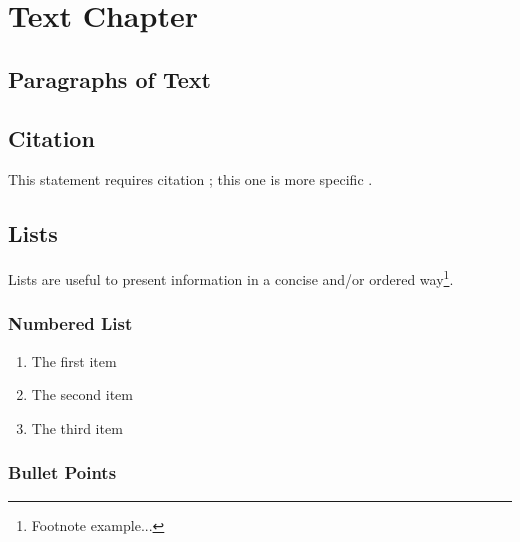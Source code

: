 \documentclass[11pt,fleqn]{book} %
\begin{document}
\pagestyle{fancy} %



\chapter{Text Chapter}

\section{Paragraphs of Text}

\lipsum[1-7] %


\section{Citation}

This statement requires citation \cite{book_key}; this one is more specific \cite[122]{article_key}.


\section{Lists}

Lists are useful to present information in a concise and/or ordered way\footnote{Footnote example...}.

\subsection{Numbered List}

\begin{enumerate}
\item The first item
\item The second item
\item The third item
\end{enumerate}

\subsection{Bullet Points}
\end{document}
